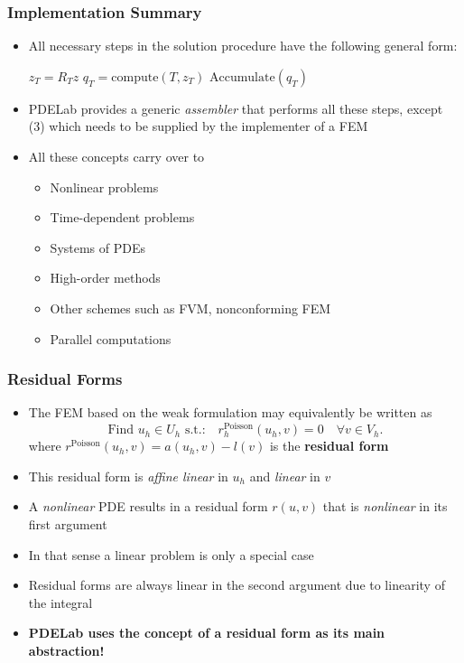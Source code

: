 \documentclass[aspectratio=169,11pt]{beamer}
\theoremstyle{definition}
\begin{document}
\begin{frame}
\frametitle{Implementation Summary}
\begin{itemize}
\item All necessary steps in the solution procedure have the following general form:
\begin{algorithmic}[1]
 
\State $z_T = R_T z$ 
\State $q_T=\text{compute}(T,z_T)$ 
\State $\text{Accumulate}(q_T)$ 
\EndFor
\end{algorithmic}
\item PDELab provides a generic {\em assembler} that performs all these steps,
except (3) which needs to be supplied by the implementer of a FEM
\item All these concepts carry over to
\begin{itemize}
\item Nonlinear problems
\item Time-dependent problems
\item Systems of PDEs
\item High-order methods
\item Other schemes such as FVM, nonconforming FEM
\item Parallel computations
\end{itemize}
\end{itemize}
\end{frame}

\begin{frame}
\frametitle{Residual Forms}
\begin{itemize}
\item The FEM based on the weak formulation may equivalently
be written as
\begin{equation*}
\text{Find $u_h\in U_h$ s.t.:} \quad r_h^\text{Poisson}(u_h,v)=0 \quad \forall v\in V_h.
\end{equation*}
where $r^\text{Poisson}(u_h,v) = a(u_h,v) - l(v)$ is the \textbf{residual form}
\item This residual form is {\em affine linear} in $u_h$ and {\em linear} in $v$
\item A {\em nonlinear} PDE results in a residual form $r(u,v)$ that is {\em nonlinear}
in its first argument
\item In that sense a linear problem is only a special case
\item Residual forms are always linear in the second argument due
to linearity of the integral
\item \textbf{PDELab uses the concept of a residual form as its main abstraction!}
\end{itemize}
\end{frame}
\end{document}
